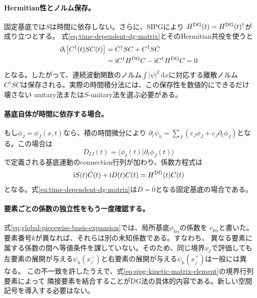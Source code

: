 \documentclass[11pt,a4paper]{article}
\newcommand{\dd}{\mathrm d}
\begin{document}
\paragraph{Hermitian性とノルム保存。}
固定基底では$S$は時間に依存しない。さらに、SIPGにより
$H^{\rm DG}(t)=H^{\rm DG}(t)^\dagger$が成り立つとする。
式\eqref{eq:time-dependent-dg-matrix}とそのHermitian共役を使うと
\begin{align}
 \partial_t\!\left[C^\dagger(t)SC(t)\right]
 &=\dot C^\dagger SC+C^\dagger S\dot C \notag\\
 &=\mathrm iC^\dagger H^{\rm DG}C
 -\mathrm iC^\dagger H^{\rm DG}C=0
 \label{eq:dg-norm-conservation}
\end{align}
となる。したがって、連続波動関数のノルム$\int|\psi|^2\,\dd x$に対応する離散ノルム
$C^\dagger SC$は保存される。実際の時間積分法には、この保存性を数値的にできるだけ壊さない
unitary法または$S$-unitary法を選ぶ必要がある。

\paragraph{基底自体が時間に依存する場合。}
もし$\phi_J=\phi_J(x,t)$なら、積の時間微分により
$\partial_t\psi_h=\sum_J(\dot c_J\phi_J+c_J\partial_t\phi_J)$となる。この場合は
\begin{equation}
 D_{IJ}(t)=\langle\phi_I(t)|\partial_t\phi_J(t)\rangle
 \label{eq:moving-basis-connection}
\end{equation}
で定義される基底運動のconnection行列が加わり、係数方程式は
\begin{equation}
 \mathrm iS(t)\dot C(t)+\mathrm iD(t)C(t)=H^{\rm DG}(t)C(t)
 \label{eq:moving-basis-time-dependent-dg}
\end{equation}
となる。式\eqref{eq:time-dependent-dg-matrix}は$D=0$となる固定基底の場合である。

\paragraph{要素ごとの係数の独立性をもう一度確認する。}
式\eqref{eq:global-piecewise-basis-expansion}では、局所基底$\phi_{k\alpha}$の係数を
$c_{k\alpha}$と書いた。要素番号$k$が異なれば、それらは別の未知係数である。すなわち、
異なる要素に属する係数の間へ等値条件を課していない。そのため、同じ境界$x_j$で評価しても
左要素の展開が与える$\psi_h(x_j^-)$と右要素の展開が与える$\psi_h(x_j^+)$は一般には異なる。
この不一致を許したうえで、式\eqref{eq:sipg-kinetic-matrix-element}の境界行列要素によって
隣接要素を結合することがDG法の具体的内容である。新しい空間記号を導入する必要はない。
\end{document}
